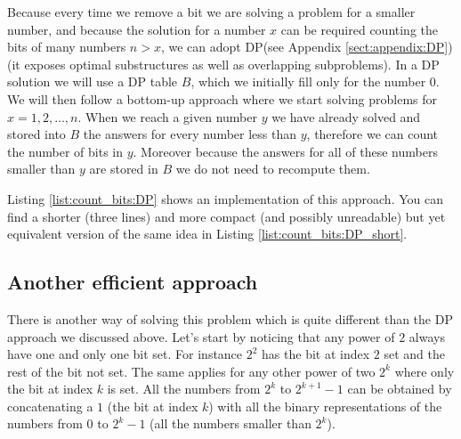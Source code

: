 Because every time we remove a bit we are solving a problem for a smaller number, and because the
solution for a number $x$ can be required counting the bits of many numbers $n>x$, we can adopt
DP(see Appendix \ref{sect:appendix:DP}) (it exposes optimal substructures as well as overlapping subproblems). In a
DP solution we will use  a DP table $B$, which we initially fill only for the number $0$. We will
then follow a bottom-up approach where we start solving problems for $x=1,2,\ldots,n$. When we
reach a given number $y$ we have already solved and stored into $B$ the answers for every number less
than $y$, therefore we can count the number of bits in $y$.
Moreover because the answers for all of
these numbers smaller than $y$ are stored in $B$ we do not need to recompute them. 

Listing \ref{list:count_bits:DP} shows an implementation of this approach. You can find a shorter (three
lines) and more compact (and possibly unreadable) but yet equivalent version of the same idea in
Listing \ref{list:count_bits:DP_short}.





\subsection{Another efficient approach}
\label{count_bits:sec:pattern}
There is another way of solving this problem which is quite different than the DP approach we
discussed above. Let's start by noticing that any power of $2$ always have one and only one bit set.
For instance $2^2$ has the bit at index $2$ set and the rest of the bit not set. The same applies
for any other power of two $2^k$ where only the bit at index $k$ is set. All the numbers from $2^k$
to $2^{k+1}-1$ can be obtained by concatenating a $1$ (the bit at index $k$) with all the binary
representations of the numbers from $0$ to $2^k-1$ (all the numbers smaller than $2^k$).

